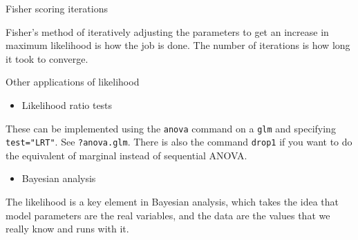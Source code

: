 \documentclass[
  ignorenonframetext,
]{beamer}
\providecommand{\tightlist}{%
  \setlength{\itemsep}{0pt}\setlength{\parskip}{0pt}}
\begin{document}
\begin{frame}{Fisher scoring iterations}
\protect\hypertarget{fisher-scoring-iterations}{}

Fisher's method of iteratively adjusting the parameters to get an
increase in maximum likelihood is how the job is done. The number of
iterations is how long it took to converge.

\end{frame}

\begin{frame}[fragile]{Other applications of likelihood}
\protect\hypertarget{other-applications-of-likelihood}{}

\begin{itemize}
\tightlist
\item
  Likelihood ratio tests
\end{itemize}

These can be implemented using the \texttt{anova} command on a
\texttt{glm} and specifying \texttt{test="LRT"}. See
\texttt{?anova.glm}. There is also the command \texttt{drop1} if you
want to do the equivalent of marginal instead of sequential ANOVA.

\begin{itemize}
\tightlist
\item
  Bayesian analysis
\end{itemize}

The likelihood is a key element in Bayesian analysis, which takes the
idea that model parameters are the real variables, and the data are the
values that we really know and runs with it.

\end{frame}
\end{document}
